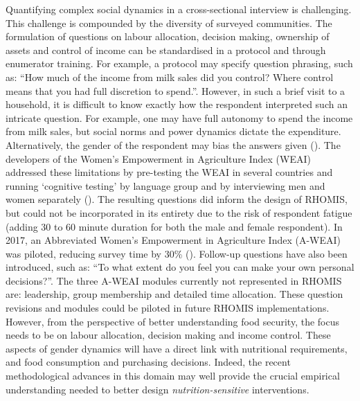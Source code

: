 Quantifying complex social dynamics in a cross-sectional interview is challenging. This challenge is compounded by the diversity of surveyed communities. The formulation of questions on labour allocation, decision making, ownership of assets and control of income can be standardised in a protocol and through enumerator training. For example, a protocol may specify question phrasing, such as: ``How much of the income from milk sales did you control? Where control means that you had full discretion to spend.''. However, in such a brief visit to a household, it is difficult to know exactly how the respondent interpreted such an intricate question. For example, one may have full autonomy to spend the income from milk sales, but social norms and power dynamics dictate the expenditure. Alternatively, the gender of the respondent may bias the answers given (\citealp{Tavenner2018}). The developers of the Women's Empowerment in Agriculture Index (WEAI) addressed these limitations by pre-testing the WEAI in several countries and running `cognitive testing' by language group and by interviewing men and women separately (\citealp{Malapit2015}). The resulting questions did inform the design of RHOMIS, but could not be incorporated in its entirety due to the risk of respondent fatigue (adding 30 to 60 minute duration for both the male and female respondent). In 2017, an Abbreviated Women's Empowerment in Agriculture Index (A-WEAI) was piloted, reducing survey time by 30\% (\citealp{Malapit2017}). Follow-up questions have also been introduced, such as: ``To what extent do you feel you can make your own personal decisions?''. The three A-WEAI modules currently not represented in RHOMIS are: leadership, group membership and detailed time allocation. These question revisions and modules could be piloted in future RHOMIS implementations. However, from the perspective of better understanding food security, the focus needs to be on labour allocation, decision making and income control. These aspects of gender dynamics will have a direct link with nutritional requirements, and food consumption and purchasing decisions. Indeed, the recent methodological advances in this domain may well provide the crucial empirical understanding needed to better design \textit{nutrition-sensitive} interventions.

